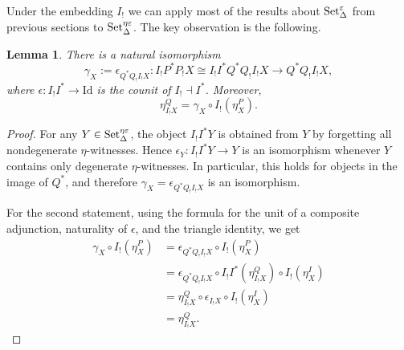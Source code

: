 \documentclass{article}
\theoremstyle{plain}
\newtheorem{lemma}[theorem]{Lemma}
\theoremstyle{definition}
\theoremstyle{remark}
\begin{document}
Under the embedding $I_!$ we can apply most of the results about $\mathrm{Set}^\varepsilon_\Delta$ from previous sections to $\mathrm{Set}^{\eta\varepsilon}_\Delta$. The key observation is the following.
\begin{lemma}\label{lem:recycling}
There is a natural isomorphism
\[
\gamma_X:=\epsilon_{Q^*Q_!I_!X}\colon
I_!P^*P_!X
\cong
I_!I^*Q^*Q_!I_!X
\longrightarrow
Q^*Q_!I_!X,
\]
where $\epsilon\colon I_!I^*\to\mathrm{Id}$ is the counit of
$I_!\dashv I^*$.
Moreover,
\[
\eta^Q_{I_!X}=\gamma_X\circ I_!(\eta^P_X).
\]
\end{lemma}

\begin{proof}
For any $Y\in\mathrm{Set}^{\eta\varepsilon}_\Delta$, the object $I_!I^*Y$ is obtained from $Y$ by
forgetting all nondegenerate $\eta$-witnesses. Hence
$\epsilon_Y\colon I_!I^*Y\to Y$ is an isomorphism whenever $Y$
contains only degenerate $\eta$-witnesses. In particular, this holds for
objects in the image of $Q^*$, and therefore
$\gamma_X=\epsilon_{Q^*Q_!I_!X}$ is an isomorphism.

For the second statement, using the formula for the unit of a composite
adjunction, naturality of $\epsilon$, and the triangle identity, we get
\[
\begin{aligned}
\gamma_X\circ I_!(\eta^P_X)
&=\epsilon_{Q^*Q_!I_!X}\circ I_!(\eta^P_X)\\
&=\epsilon_{Q^*Q_!I_!X}
  \circ I_!I^*(\eta^Q_{I_!X})
  \circ I_!(\eta^I_X)\\
&=\eta^Q_{I_!X}\circ
  \epsilon_{I_!X}\circ I_!(\eta^I_X)\\
&=\eta^Q_{I_!X}.
\end{aligned}
\]
\end{proof}
\end{document}
